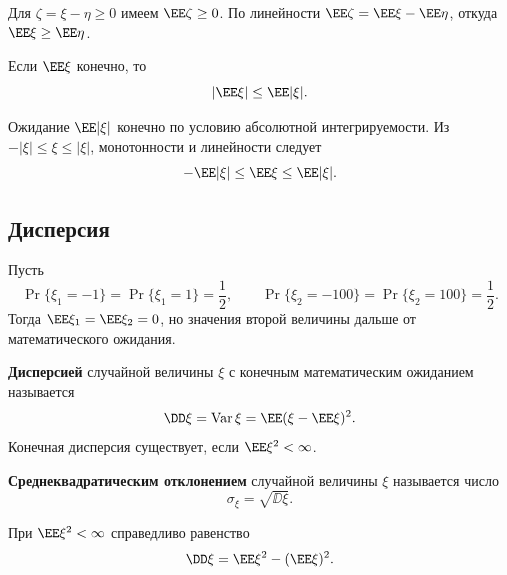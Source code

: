 \begin{Proof}
    Для $\zeta=\xi-\eta\geq0$ имеем $\EE\zeta\geq0$.
    По линейности $\EE\zeta=\EE\xi-\EE\eta$, откуда
    $\EE\xi\geq\EE\eta$.
\end{Proof}

\newpage
\begin{theorem}
    Если $\EE\xi$ конечно, то
    \[
        |\EE\xi|\leq\EE|\xi|.
    \]
\end{theorem}

\begin{Proof}
    Ожидание $\EE|\xi|$ конечно по условию абсолютной интегрируемости.
    Из $-|\xi|\leq\xi\leq|\xi|$, монотонности и линейности следует
    \[
        -\EE|\xi|\leq\EE\xi\leq\EE|\xi|.
    \]
\end{Proof}



\newpage
\subsection{Дисперсия}

\begin{example}
    Пусть
    \[
        \Pr\{\xi_1=-1\}=\Pr\{\xi_1=1\}=\frac12,\qquad
        \Pr\{\xi_2=-100\}=\Pr\{\xi_2=100\}=\frac12.
    \]
    Тогда $\EE\xi_1=\EE\xi_2=0$, но значения второй величины
    дальше от математического ожидания.
\end{example}

\begin{definition}
    \textbf{Дисперсией} случайной величины $\xi$ с конечным математическим
    ожиданием называется
    \[
        \DD\xi=\operatorname{Var}\xi
        =\EE(\xi-\EE\xi)^2.
    \]
    Конечная дисперсия существует, если $\EE\xi^2<\infty$.
\end{definition}

\begin{definition}
    \textbf{Среднеквадратическим отклонением} случайной величины $\xi$
    называется число
    \[
        \sigma_\xi=\sqrt{\DD\xi}.
    \]
\end{definition}

\begin{theorem}
    При $\EE\xi^2<\infty$ справедливо равенство
    \[
        \DD\xi=\EE\xi^2-(\EE\xi)^2.
    \]
\end{theorem}

